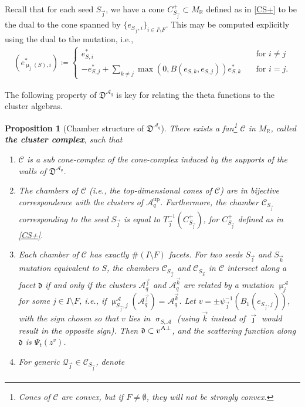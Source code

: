 \documentclass{amsart}
\DeclareMathOperator{\up}{up}
\let\bb=\mathbb
\let\f=\mathfrak
\let\s=\mathcal
\newcommand {\sQ} {\mathcal{Q}}
\newcommand {\jj} {\vec{\jmath}}
\newcommand {\kkk} {\vec{k}}
\renewcommand{\sigma}{\upsigma}
\renewcommand{\Lambda}{\Uplambda}
\renewcommand{\mu}{\upmu}
\theoremstyle{plain}%
\newtheorem{prop}[thm]{Proposition}
\theoremstyle{definition}
\theoremstyle{remark}
\begin{document}
Recall that for each seed $S_{\jj}$, we have a cone $C_{S_{\jj}}^+\subset M_{\bb{R}}$ defined as in \eqref{CS+} to be the dual to the cone spanned by $\{e_{S_{\jj},i}\}_{i\in I\setminus F}$.  This may be computed explicitly using the dual to the mutation, i.e.,
\begin{align*}
    (e_{\mu_j(S),i}^*)\coloneqq  \begin{cases}
     e_{S,i}^* \quad &\mbox{for $i\neq j$}\\
   -e_{S,j}^*+\sum_{k\neq j} \max(0,B(e_{S,k},e_{S,j}))e_{S,k}^*\quad  & \mbox{for $i=j$.}
    \end{cases}
\end{align*}


The following property of $\f{D}^{\s{A}_q}$ is key for relating the theta functions to the cluster algebras.
\begin{prop}[Chamber structure of $\f{D}^{\s{A}_q}$]\label{Chambers}
There exists a fan\footnote{Cones of $\s{C}$ are convex, but if $F\neq \emptyset$, they will not be strongly convex.} $\s{C}$ in $M_{\bb{R}}$, called \textbf{the cluster complex}, such that
\begin{enumerate}
    \item $\s{C}$ is a sub cone-complex of the cone-complex induced by the supports of the walls of $\f{D}^{\s{A}_q}$.
    \item The chambers of $\s{C}$ (i.e., the top-dimensional cones of $\s{C}$) are in bijective correspondence with the clusters of $\s{A}_q^{\up}$.  Furthermore, the chamber $\s{C}_{S_{\jj}}$ corresponding to the seed $S_{\jj}$ is equal to $T_{\jj}^{-1}(C_{S_{\jj}}^+)$, for $C_{S_{\jj}}^+$ defined as in \eqref{CS+}.
    \item Each chamber of $\s{C}$ has exactly $\#(I\setminus F)$ facets.  For two seeds $S_{\jj}$ and $S_{\kkk}$ mutation equivalent to $S$, the chambers $\s{C}_{S_{\jj}}$ and $\s{C}_{S_{\kkk}}$ in $\s{C}$ intersect along a facet $\f{d}$ if and 
    only if the clusters $\s{A}_q^{\jj}$ and $\s{A}_q^{\kkk}$ are related by a mutation $\mu^{\s{A}}_j$ for some $j\in I\setminus F$, 
    i.e., if $\mu_{S_{\jj},j}^{\s{A}}(\s{A}_q^{\jj} )=\s{A}_q^{\kkk}$.  Let $v= \pm \psi_{\jj}^{-1}(B_1(e_{S_{\jj},j}))$, with the sign chosen so that $v$ lies in $\sigma_{S,\s{A}}$ (using $\kkk$ instead of $\jj$ would result in the opposite sign).
     Then $\f{d}\subset v^{\Lambda\perp}$, and the scattering function along $\f{d}$ is $\Psi_t(z^{v})$. 
     \item For generic $\sQ_{\jj}\in \s{C}_{S_{\jj}}$, denote
     \begin{align}\label{psij}

\end{align}
\end{enumerate}
\end{prop}
\end{document}
